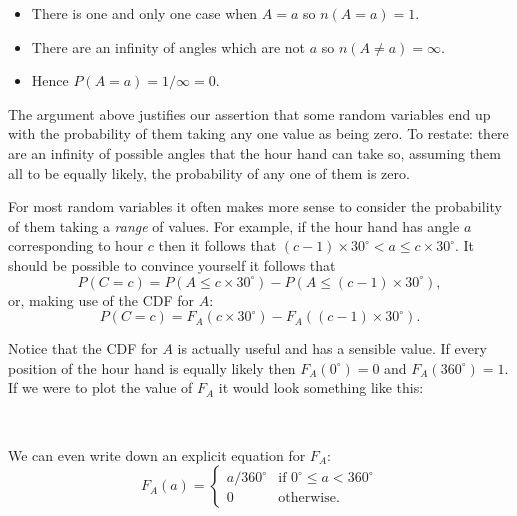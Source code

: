 \documentclass[a4paper]{article}
\begin{document}
\begin{itemize}

\item There is one and only one case when $A = a$ so $n(A = a) = 1$.

\item There are an infinity of angles which are not $a$ so $n(A \ne a) = \infty$.

\item Hence $P(A = a) = 1 / \infty = 0$.

\end{itemize}

The argument above justifies our assertion that some random variables end up
with the probability of them taking any one value as being zero. To restate:
there are an infinity of possible angles that the hour hand can take so,
assuming them all to be equally likely, the probability of any one of them is
zero.

For most random variables it often makes more sense to consider the probability
of them taking a \emph{range} of values. For example, if the hour hand has
angle $a$ corresponding to hour $c$ then it follows that $(c-1) \times 30^\circ
< a \le c \times 30^\circ$. It should be possible to convince yourself it
follows that
\[
P(C = c) = P(A \le c \times 30^\circ) - P(A \le (c-1) \times 30^\circ),
\]
or, making use of the CDF for $A$:
\[
P(C = c) = F_A(c \times 30^\circ) - F_A((c-1) \times 30^\circ).
\]

Notice that the CDF for $A$ is actually useful and has a sensible value. If
every position of the hour hand is equally likely then $F_A(0^\circ) = 0$ and
$F_A(360^\circ) = 1$. If we were to plot the value of $F_A$ it would look
something like this:

{\center
{} \\ \null
}
We can even write down an explicit equation for $F_A$:
\[
F_A(a) = \left\{
\begin{array}{cl}
a / 360^\circ & \mbox{if } 0^\circ \le a < 360^\circ \\
0 & \mbox{otherwise.}
\end{array}
\right.
\]
\end{document}
